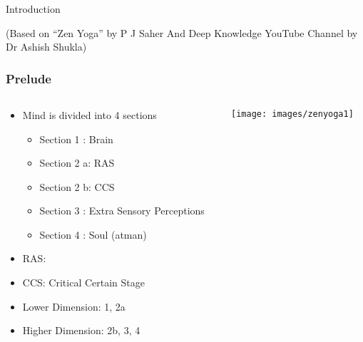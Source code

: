 \begin{frame}[fragile]\frametitle{}
\begin{center}
{\Large Introduction}


{\tiny (Based on ``Zen Yoga'' by P J Saher And Deep Knowledge YouTube Channel by Dr Ashish Shukla)}
\end{center}
\end{frame}


\begin{frame}[fragile]
\frametitle{Prelude}

\begin{columns}[T] %
\begin{column}{.48\textwidth}
\begin{itemize}
\item Mind is divided into 4 sections
	\begin{itemize}
	\item Section 1 : Brain
	\item Section 2 a: RAS
	\item Section 2 b: CCS
	\item Section 3 : Extra Sensory Perceptions
	\item Section 4 : Soul (atman)
	\end{itemize}
\item RAS:
\item CCS: Critical Certain Stage
\item Lower Dimension: 1, 2a
\item Higher Dimension: 2b, 3, 4
\end{itemize}
\end{column}%
\hfill%
\begin{column}{.48\textwidth}
 \begin{center}
\texttt{[image: images/zenyoga1]}
\end{center}

\end{column}%
\end{columns}
\end{frame}
